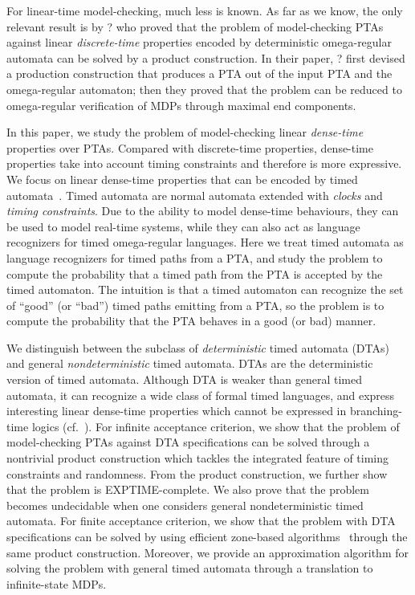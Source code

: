 For linear-time model-checking, much less is known. 
As far as we know, the only relevant result is by ? \cite{?} who proved that the problem of model-checking PTAs against linear \emph{discrete-time} properties encoded by deterministic omega-regular automata can be solved by a product construction.
In their paper, ? \cite{?} first devised a production construction that produces a PTA out of the input PTA and the omega-regular automaton;
then they proved that the problem can be reduced to omega-regular verification of MDPs through maximal end components. 

In this paper, we study the problem of model-checking linear \emph{dense-time} properties over PTAs. 
Compared with discrete-time properties, dense-time properties take into account timing constraints and therefore is more expressive. 
We focus on linear dense-time properties that can be encoded by timed automata~\cite{DBLP:journals/tcs/AlurD94}. 
Timed automata are normal automata extended with \emph{clocks} and \emph{timing constraints}.
Due to the ability to model dense-time behaviours, 
they can be used to model real-time systems, while they can also act as language recognizers for timed omega-regular languages. 
Here we treat timed automata as language recognizers for timed paths from a PTA, and study
the problem to compute the probability that a timed path from the PTA is accepted by the timed automaton.
The intuition is that a timed automaton can recognize the set of ``good'' (or ``bad'') timed paths emitting from a PTA,
so the problem is to compute the probability that the PTA behaves in a good (or bad) manner.

\smallskip
{} We distinguish between the subclass of \emph{deterministic} timed automata (DTAs) and general \emph{nondeterministic} timed automata.
DTAs are the deterministic version of timed automata. 
Although DTA is weaker than general timed automata, it can recognize a wide class of formal timed languages, and express interesting linear dense-time properties which cannot be expressed in branching-time logics (cf.~\cite{DBLP:journals/tse/DonatelliHS09}).
For infinite acceptance criterion, we show that the problem of model-checking PTAs against DTA specifications can be solved through a nontrivial product construction which tackles the integrated feature of timing constraints and randomness. From the product construction, we further show that the problem is EXPTIME-complete.
We also prove that the problem becomes undecidable when one considers general nondeterministic timed automata. 
For finite acceptance criterion, we show that the problem with DTA specifications can be solved by using efficient zone-based algorithms~\cite{JensenPTA,DBLP:journals/tcs/Beauquier03,DBLP:journals/tcs/KwiatkowskaNSS02} through the same product construction.
Moreover, we provide an approximation algorithm for solving the problem with general timed automata through a translation to infinite-state MDPs. 





